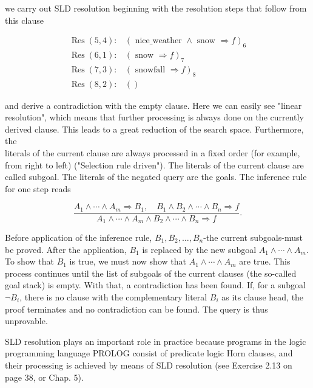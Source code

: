 \documentclass[10pt]{article}
\begin{document}
we carry out SLD resolution beginning with the resolution steps that follow from this clause

$$
\begin{array}{ll}
\operatorname{Res}(5,4): & (\text { nice_weather } \wedge \text { snow } \Rightarrow f)_{6} \\
\operatorname{Res}(6,1): & (\text { snow } \Rightarrow f)_{7} \\
\operatorname{Res}(7,3): & (\text { snowfall } \Rightarrow f)_{8} \\
\operatorname{Res}(8,2): & ()
\end{array}
$$

and derive a contradiction with the empty clause. Here we can easily see "linear resolution", which means that further processing is always done on the currently derived clause. This leads to a great reduction of the search space. Furthermore, the\\
literals of the current clause are always processed in a fixed order (for example, from right to left) ("Selection rule driven"). The literals of the current clause are called subgoal. The literals of the negated query are the goals. The inference rule for one step reads

$$
\frac{A_{1} \wedge \cdots \wedge A_{m} \Rightarrow B_{1}, \quad B_{1} \wedge B_{2} \wedge \cdots \wedge B_{n} \Rightarrow f}{A_{1} \wedge \cdots \wedge A_{m} \wedge B_{2} \wedge \cdots \wedge B_{n} \Rightarrow f} .
$$

Before application of the inference rule, $B_{1}, B_{2}, \ldots, B_{n}$-the current subgoals-must be proved. After the application, $B_{1}$ is replaced by the new subgoal $A_{1} \wedge \cdots \wedge A_{m}$. To show that $B_{1}$ is true, we must now show that $A_{1} \wedge \cdots \wedge A_{m}$ are true. This process continues until the list of subgoals of the current clauses (the so-called goal stack) is empty. With that, a contradiction has been found. If, for a subgoal $\neg B_{i}$, there is no clause with the complementary literal $B_{i}$ as its clause head, the proof terminates and no contradiction can be found. The query is thus unprovable.

SLD resolution plays an important role in practice because programs in the logic programming language PROLOG consist of predicate logic Horn clauses, and their processing is achieved by means of SLD resolution (see Exercise 2.13 on page 38, or Chap. 5).
\end{document}
